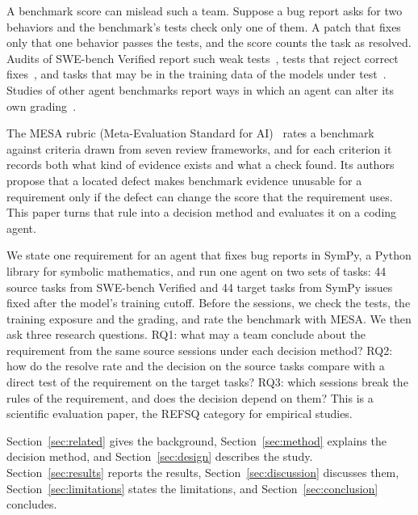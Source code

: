 \documentclass[runningheads]{llncs}
\begin{document}
A benchmark score can mislead such a team. Suppose a bug report asks for two behaviors and the benchmark's tests check only one of them. A patch that fixes only that one behavior passes the tests, and the score counts the task as resolved. Audits of SWE-bench Verified report such weak tests~\cite{yu_utboost_2025,wang_solved_issues_2026}, tests that reject correct fixes~\cite{openai_swebench_verified_contamination_2025}, and tasks that may be in the training data of the models under test~\cite{openai_swebench_verified_contamination_2025,liang_swebench_illusion_2025}. Studies of other agent benchmarks report ways in which an agent can alter its own grading~\cite{wang_benchjack_2026,mohl_transcript_flaws_2026}.

The MESA rubric (Meta-Evaluation Standard for AI)~\cite{anonymous_companion_2027} rates a benchmark against criteria drawn from seven review frameworks, and for each criterion it records both what kind of evidence exists and what a check found. Its authors propose that a located defect makes benchmark evidence unusable for a requirement only if the defect can change the score that the requirement uses. This paper turns that rule into a decision method and evaluates it on a coding agent.

We state one requirement for an agent that fixes bug reports in SymPy, a Python library for symbolic mathematics, and run one agent on two sets of tasks: 44 source tasks from SWE-bench Verified and 44 target tasks from SymPy issues fixed after the model's training cutoff. Before the sessions, we check the tests, the training exposure and the grading, and rate the benchmark with MESA. We then ask three research questions. RQ1: what may a team conclude about the requirement from the same source sessions under each decision method? RQ2: how do the resolve rate and the decision on the source tasks compare with a direct test of the requirement on the target tasks? RQ3: which sessions break the rules of the requirement, and does the decision depend on them? This is a scientific evaluation paper, the REFSQ category for empirical studies.

Section~\ref{sec:related} gives the background, Section~\ref{sec:method} explains the decision method, and Section~\ref{sec:design} describes the study. Section~\ref{sec:results} reports the results, Section~\ref{sec:discussion} discusses them, Section~\ref{sec:limitations} states the limitations, and Section~\ref{sec:conclusion} concludes.
\end{document}
